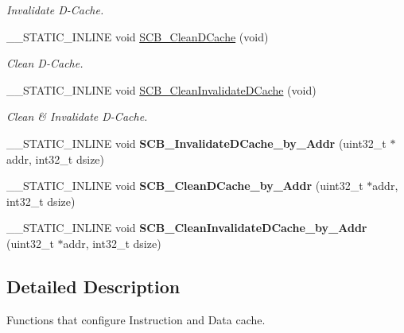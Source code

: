 \begin{DoxyCompactItemize}
\begin{DoxyCompactList}\small\item\em Invalidate D-\/\+Cache. \end{DoxyCompactList}\item 
\+\_\+\+\_\+\+S\+T\+A\+T\+I\+C\+\_\+\+I\+N\+L\+I\+NE void \hyperlink{group___c_m_s_i_s___core___cache_functions_ga55583e3065c6eabca204b8b89b121c4c}{S\+C\+B\+\_\+\+Clean\+D\+Cache} (void)
\begin{DoxyCompactList}\small\item\em Clean D-\/\+Cache. \end{DoxyCompactList}\item 
\+\_\+\+\_\+\+S\+T\+A\+T\+I\+C\+\_\+\+I\+N\+L\+I\+NE void \hyperlink{group___c_m_s_i_s___core___cache_functions_ga1b741def9e3b2ca97dc9ea49b8ce505c}{S\+C\+B\+\_\+\+Clean\+Invalidate\+D\+Cache} (void)
\begin{DoxyCompactList}\small\item\em Clean \& Invalidate D-\/\+Cache. \end{DoxyCompactList}\item 
\+\_\+\+\_\+\+S\+T\+A\+T\+I\+C\+\_\+\+I\+N\+L\+I\+NE void {\bfseries S\+C\+B\+\_\+\+Invalidate\+D\+Cache\+\_\+by\+\_\+\+Addr} (uint32\+\_\+t $\ast$addr, int32\+\_\+t dsize)\hypertarget{group___c_m_s_i_s___core___cache_functions_ga503ef7ef58c0773defd15a82f6336c09}{}\label{group___c_m_s_i_s___core___cache_functions_ga503ef7ef58c0773defd15a82f6336c09}

\item 
\+\_\+\+\_\+\+S\+T\+A\+T\+I\+C\+\_\+\+I\+N\+L\+I\+NE void {\bfseries S\+C\+B\+\_\+\+Clean\+D\+Cache\+\_\+by\+\_\+\+Addr} (uint32\+\_\+t $\ast$addr, int32\+\_\+t dsize)\hypertarget{group___c_m_s_i_s___core___cache_functions_ga696fadbf7b9cc71dad42fab61873a40d}{}\label{group___c_m_s_i_s___core___cache_functions_ga696fadbf7b9cc71dad42fab61873a40d}

\item 
\+\_\+\+\_\+\+S\+T\+A\+T\+I\+C\+\_\+\+I\+N\+L\+I\+NE void {\bfseries S\+C\+B\+\_\+\+Clean\+Invalidate\+D\+Cache\+\_\+by\+\_\+\+Addr} (uint32\+\_\+t $\ast$addr, int32\+\_\+t dsize)\hypertarget{group___c_m_s_i_s___core___cache_functions_ga630131b2572eaa16b569ed364dfc895e}{}\label{group___c_m_s_i_s___core___cache_functions_ga630131b2572eaa16b569ed364dfc895e}

\end{DoxyCompactItemize}


\subsection{Detailed Description}
Functions that configure Instruction and Data cache. 



